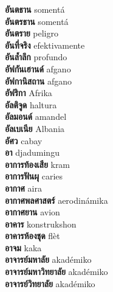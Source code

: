 \textbf{ อันตธาน  } somentá \\
\textbf{ อันตรธาน  } somentá \\
\textbf{ อันตราย  } peligro \\
\textbf{ อันที่จริง  } efektivamente \\
\textbf{ อันล้ำลึก  } profundo \\
\textbf{ อัฟกันเฮานด์  } afgano \\
\textbf{ อัฟกานิสถาน  } afgano \\
\textbf{ อัฟริกา  } Afrika \\
\textbf{ อัลติจูด  } haltura \\
\textbf{ อัลมอนด์  } amandel \\
\textbf{ อัลเบเนีย  } Albania \\
\textbf{ อัศว  } cabay \\
\textbf{ อา  } djadumingu \\
\textbf{ อาการท้องเสีย  } kram \\
\textbf{ อาการฟันผุ  } caries \\
\textbf{ อากาศ  } aira \\
\textbf{ อากาศพลศาสตร์  } aerodinámika \\
\textbf{ อากาศยาน  } avion \\
\textbf{ อาคาร  } konstrukshon \\
\textbf{ อาคารห้องชุด  } flèt \\
\textbf{ อาจม  } kaka \\
\textbf{ อาจารย์มหาลัย  } akadémiko \\
\textbf{ อาจารย์มหาวิทยาลัย  } akadémiko \\
\textbf{ อาจารย์วิทยาลัย  } akadémiko \\
